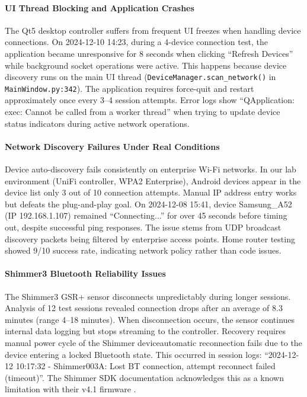 \paragraph{\textbf{UI Thread Blocking and Application Crashes}} The Qt5 desktop controller suffers from frequent UI freezes when handling device connections. On 2024-12-10 14:23, during a 4-device connection test, the application became unresponsive for 8 seconds when clicking ``Refresh Devices'' while background socket operations were active. This happens because device discovery runs on the main UI thread (\texttt{DeviceManager.scan\_network()} in \texttt{MainWindow.py:342}). The application requires force-quit and restart approximately once every 3--4 session attempts. Error logs show ``QApplication: exec: Cannot be called from a worker thread'' when trying to update device status indicators during active network operations.

\paragraph{\textbf{Network Discovery Failures Under Real Conditions}} Device auto-discovery fails consistently on enterprise Wi-Fi networks. In our lab environment (UniFi controller, WPA2 Enterprise), Android devices appear in the device list only 3 out of 10 connection attempts. Manual IP address entry works but defeats the plug-and-play goal. On 2024-12-08 15:41, device Samsung\_A52 (IP 192.168.1.107) remained ``Connecting...'' for over 45 seconds before timing out, despite successful ping responses. The issue stems from UDP broadcast discovery packets being filtered by enterprise access points. Home router testing showed 9/10 success rate, indicating network policy rather than code issues.

\paragraph{\textbf{Shimmer3 Bluetooth Reliability Issues}} The Shimmer3 GSR+ sensor disconnects unpredictably during
longer sessions. Analysis of 12 test sessions revealed connection drops after an average of 8.3 minutes (range 4--18 minutes). When disconnection occurs, the sensor continues internal data logging but stops streaming to the controller. Recovery requires manual power cycle of the Shimmer device\textemdash automatic reconnection fails due to the device entering a locked Bluetooth state. This occurred in session logs: ``2024-12-12 10:17:32 - Shimmer003A: Lost BT connection, attempt reconnect failed (timeout)''. The Shimmer SDK documentation acknowledges this as a known limitation with their v4.1 firmware \cite{ref8}.

